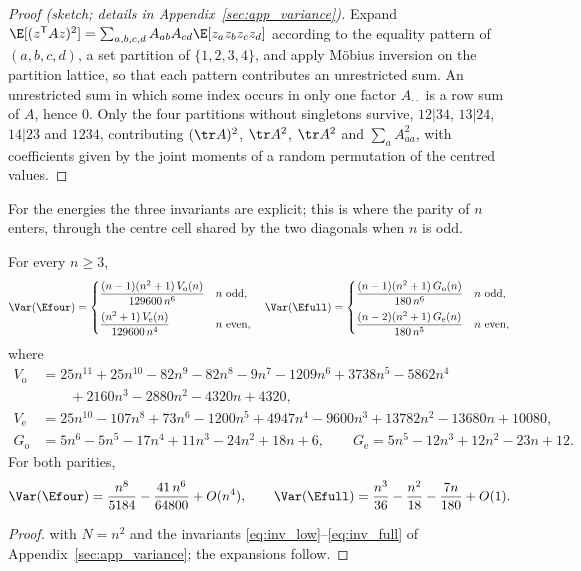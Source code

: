 \begin{proof}[Proof (sketch; details in Appendix~\ref{sec:app_variance})]
Expand $\E[(z^{\mathsf T}Az)^2]=\sum_{a,b,c,d}A_{ab}A_{cd}\E[z_az_bz_cz_d]$ according to the equality pattern of $(a,b,c,d)$, a set partition of $\{1,2,3,4\}$, and apply M\"obius inversion on the partition lattice, so that each pattern contributes an unrestricted sum.
An unrestricted sum in which some index occurs in only one factor $A_{\cdot\cdot}$ is a row sum of $A$, hence $0$.
Only the four partitions without singletons survive, $12|34$, $13|24$, $14|23$ and $1234$, contributing $(\tr A)^2$, $\tr A^2$, $\tr A^2$ and $\sum_aA_{aa}^2$, with coefficients given by the joint moments of a random permutation of the centred values.
\end{proof}

For the energies the three invariants are explicit; this is where the parity of $n$ enters, through the centre cell shared by the two diagonals when $n$ is odd.

\begin{theorem}
\label{thm:var_closed}
For every $n\ge3$,
\[
\Var(\Efour)=\begin{cases}\dfrac{(n-1)(n^2+1)\,V_{\mathrm o}(n)}{129600\,n^{6}}& n\text{ odd},\\[3mm]
\dfrac{(n^2+1)\,V_{\mathrm e}(n)}{129600\,n^{4}}& n\text{ even},\end{cases}\quad
\Var(\Efull)=\begin{cases}\dfrac{(n-1)(n^2+1)\,G_{\mathrm o}(n)}{180\,n^{6}}& n\text{ odd},\\[3mm]
\dfrac{(n-2)(n^2+1)\,G_{\mathrm e}(n)}{180\,n^{5}}& n\text{ even},\end{cases}
\]
where
\begin{align*}
V_{\mathrm o}&=25n^{11}+25n^{10}-82n^9-82n^8-9n^7-1209n^6+3738n^5-5862n^4\\&\qquad+2160n^3-2880n^2-4320n+4320,\\
V_{\mathrm e}&=25n^{10}-107n^8+73n^6-1200n^5+4947n^4-9600n^3+13782n^2-13680n+10080,\\
G_{\mathrm o}&=5n^6-5n^5-17n^4+11n^3-24n^2+18n+6,\qquad
G_{\mathrm e}=5n^5-12n^3+12n^2-23n+12 .
\end{align*}
For both parities,
\[
\Var(\Efour)=\frac{n^8}{5184}-\frac{41\,n^6}{64800}+O(n^4),\qquad
\Var(\Efull)=\frac{n^3}{36}-\frac{n^2}{18}-\frac{7n}{180}+O(1).
\]
\end{theorem}

\begin{proof}
 with $N=n^2$ and the invariants \eqref{eq:inv_low}--\eqref{eq:inv_full} of Appendix~\ref{sec:app_variance}; the expansions follow.
\end{proof}


